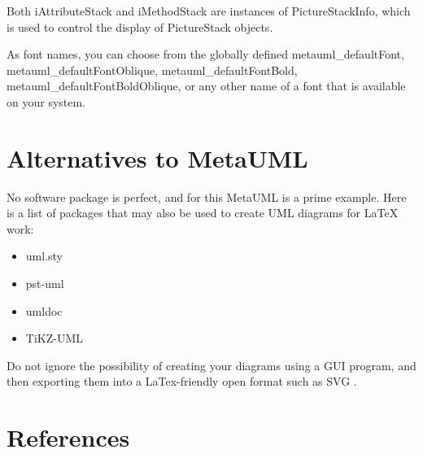 \documentclass{article}
\newcommand{\code}{\ttfamily}
\begin{document}
\begin{verbatim}
\end{verbatim}

Both {\code iAttributeStack} and {\code iMethodStack} are instances of
{\code PictureStackInfo}, which is used to control the display of {\code PictureStack} objects.

As font names, you can choose from the globally defined {\code metauml\_defaultFont}, {\code metauml\_defaultFontOblique}, {\code metauml\_defaultFontBold}, {\code metauml\_defaultFontBoldOblique}, or any other name of a font that is available on your system.

\section{Alternatives to MetaUML}

No software package is perfect, and for this MetaUML is a prime example. Here is a list of packages that may also be used to create UML diagrams for LaTeX work:

\begin{itemize}
\item uml.sty \cite{umlsty}
\item pst-uml \cite{pstumlsty}
\item umldoc \cite{umldoc}
\item TiKZ-UML \cite{tikzuml}
\end{itemize}

Do not ignore the possibility of creating your diagrams using a GUI program, and then exporting them into a LaTex-friendly open format such as SVG \cite{svglatex}.

\pagebreak


\pagebreak
\section{References}
\printbibliography[heading=none]
\end{document}
